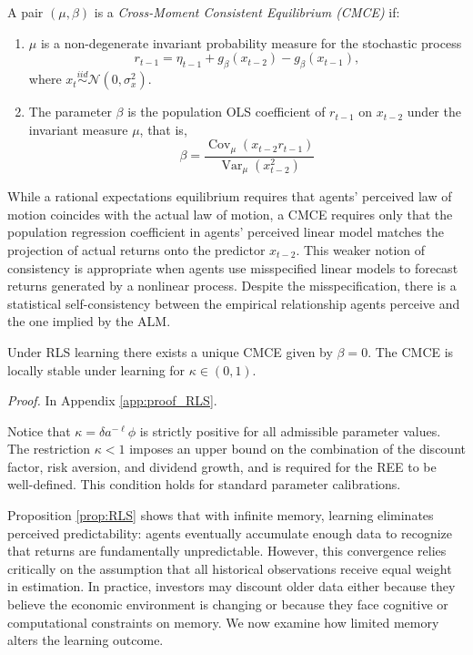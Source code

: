 \documentclass[11pt]{article}
\begin{document}
\begin{definition}\label{def:cmce}
A pair $(\mu,\beta)$ is a \emph{Cross-Moment Consistent Equilibrium (CMCE)} if:
\begin{enumerate}
    \item $\mu$ is a non-degenerate invariant probability measure for the 
    stochastic process
    \[
        r_{t-1}
        = \eta_{t-1}
        + g_{\beta}(x_{t-2})
        - g_{\beta}(x_{t-1}),
    \]
    where $x_t \stackrel{iid}{\sim} \mathcal{N}(0, \sigma^2_x)$.
    
    \item The parameter $\beta$ is the population OLS coefficient of $r_{t-1}$ 
    on $x_{t-2}$ under the invariant measure $\mu$, that is,
    \[
        \beta = \frac{\operatorname{Cov}_\mu(x_{t-2} r_{t-1})}{\operatorname{Var}_\mu(x_{t-2}^2)} 
    \]
\end{enumerate}
\end{definition}

While a rational expectations equilibrium requires that agents' perceived law of motion coincides with the actual law of motion, a CMCE requires only that the population regression coefficient in agents' perceived linear model matches the projection of actual returns onto the predictor $x_{t-2}$. 
This weaker notion of consistency is appropriate when agents use misspecified linear models to forecast returns generated by a nonlinear process. Despite the misspecification, there is a statistical self-consistency between the empirical relationship agents perceive and the one implied by the ALM.

\begin{proposition}\label{prop:RLS}
    Under RLS learning there exists a unique CMCE given by $\beta = 0$. The CMCE is locally stable under learning for $\kappa \in (0,1)$.
\end{proposition}

\textit{Proof.} In Appendix \ref{app:proof_RLS}.

Notice that $\kappa = \delta a^{-\ell} \phi$ is strictly positive for all admissible parameter values. The restriction $\kappa < 1$ imposes an upper bound on the combination of the discount factor, risk aversion, and dividend growth, and is required for the REE to be well-defined. This condition holds for standard parameter calibrations.

Proposition \ref{prop:RLS} shows that with infinite memory, learning eliminates perceived predictability: agents eventually accumulate enough data to recognize that returns are fundamentally unpredictable.
However, this convergence relies critically on the assumption that all historical observations receive equal weight in estimation. 
In practice, investors may discount older data either because they believe the economic environment is changing or because they face cognitive or computational constraints on memory. 
We now examine how limited memory alters the learning outcome.
\end{document}
